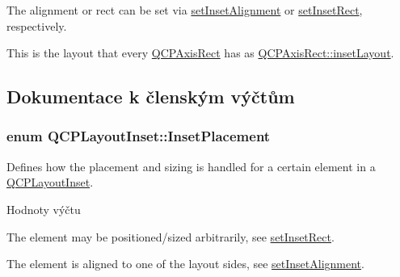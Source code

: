 The alignment or rect can be set via \hyperlink{classQCPLayoutInset_a62882a4f9ad58bb0f53da12fde022abe}{set\+Inset\+Alignment} or \hyperlink{classQCPLayoutInset_aa487c8378a6f9533567a2e6430099dc3}{set\+Inset\+Rect}, respectively.

This is the layout that every \hyperlink{classQCPAxisRect}{Q\+C\+P\+Axis\+Rect} has as \hyperlink{classQCPAxisRect_a4114887c7141b59650b7488f930993e5}{Q\+C\+P\+Axis\+Rect\+::inset\+Layout}. 

\subsection{Dokumentace k členským výčtům}
\hypertarget{classQCPLayoutInset_a8b9e17d9a2768293d2a7d72f5e298192}{}
\subsubsection[{Inset\+Placement}]{\setlength{\rightskip}{0pt plus 5cm}enum {\bf Q\+C\+P\+Layout\+Inset\+::\+Inset\+Placement}}\label{classQCPLayoutInset_a8b9e17d9a2768293d2a7d72f5e298192}


Defines how the placement and sizing is handled for a certain element in a \hyperlink{classQCPLayoutInset}{Q\+C\+P\+Layout\+Inset}. 

\begin{Desc}
\item[Hodnoty výčtu]\par
\begin{description}
\item[{\em 
\hypertarget{classQCPLayoutInset_a8b9e17d9a2768293d2a7d72f5e298192aa4802986ea2cea457f932b115acba59e}{}ip\+Free\label{classQCPLayoutInset_a8b9e17d9a2768293d2a7d72f5e298192aa4802986ea2cea457f932b115acba59e}
}]The element may be positioned/sized arbitrarily, see \hyperlink{classQCPLayoutInset_aa487c8378a6f9533567a2e6430099dc3}{set\+Inset\+Rect}. \item[{\em 
\hypertarget{classQCPLayoutInset_a8b9e17d9a2768293d2a7d72f5e298192aa81e7df4a785ddee2229a8f47c46e817}{}ip\+Border\+Aligned\label{classQCPLayoutInset_a8b9e17d9a2768293d2a7d72f5e298192aa81e7df4a785ddee2229a8f47c46e817}
}]The element is aligned to one of the layout sides, see \hyperlink{classQCPLayoutInset_a62882a4f9ad58bb0f53da12fde022abe}{set\+Inset\+Alignment}. \end{description}
\end{Desc}


